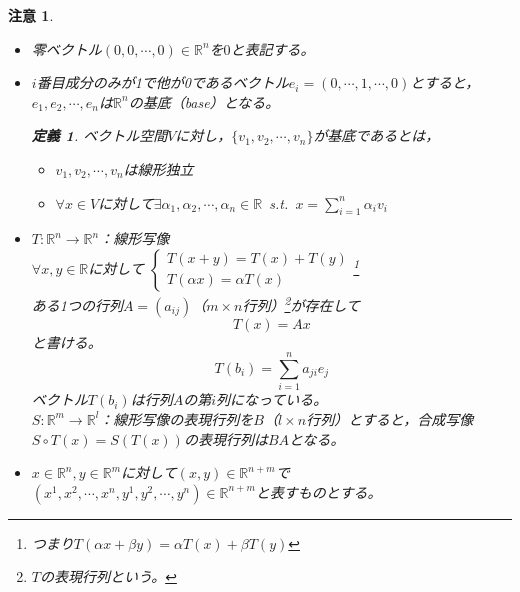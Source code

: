 \documentclass[dvipdfmx,a4j,10pt]{jsarticle}
\theoremstyle{mystyle1}
\theoremstyle{mystyle2}
\newtheorem{dfn*}{定義}
\newtheorem{note}{注意}
\begin{document}
\begin{note}　
	\begin{itemize}
		\item 零ベクトル$(0,0,\cdots,0)\in\mathbb{R}^n$を$0$と表記する。
		\item $i$番目成分のみが1で他が0であるベクトル$e_i=(0,\cdots,1,\cdots,0)$とすると，$e_1,e_2,\cdots,e_n$は$\mathbb{R}^n$の基底（base）となる。
		\begin{dfn*}
		ベクトル空間$V$に対し，$\{v_1,v_2,\cdots,v_n\}$が基底であるとは，
		\begin{itemize}
			\item $v_1,v_2,\cdots,v_n$は線形独立
			\item $\forall x\in V$に対して$\exists\alpha_1,\alpha_2,\cdots,\alpha_n\in\mathbb{R}$\ s.t.\ $x=\sum_{i=1}^n\alpha_iv_i$
		\end{itemize}
    \end{dfn*}
	\item $T:\mathbb{R}^n\to\mathbb{R}^n$：線形写像\\
	$\forall x,y\in\mathbb{R}$に対して
	$\begin{cases}
		T(x+y)=T(x)+T(y)\\
		T(\alpha x)=\alpha T(x)
	\end{cases}$\footnote{つまり$T(\alpha x+\beta y)=\alpha T(x)+\beta T(y)$}\\
	ある1つの行列$A=(a_{ij})$（$m\times n$行列）\footnote{$T$の表現行列という。}が存在して
	\[T(x)=Ax\]
	と書ける。
	\[
	T(b_i)=\sum_{i=1}^n a_{ji}e_j
	\]
	ベクトル$T(b_i)$は行列$A$の第$i$列になっている。\\
	$S:\mathbb{R}^m\to\mathbb{R}^l$：線形写像の表現行列を$B$（$l\times n$行列）とすると，合成写像$S\circ T(x)=S(T(x))$の表現行列は$BA$となる。
	\item $x\in\mathbb{R}^n,y\in\mathbb{R}^m$に対して$(x,y)\in\mathbb{R}^{n+m}$で$(x^1,x^2,\cdots,x^n,y^1,y^2,\cdots,y^n)\in\mathbb{R}^{n+m}$と表すものとする。
	\end{itemize}

\end{note}
\end{document}
